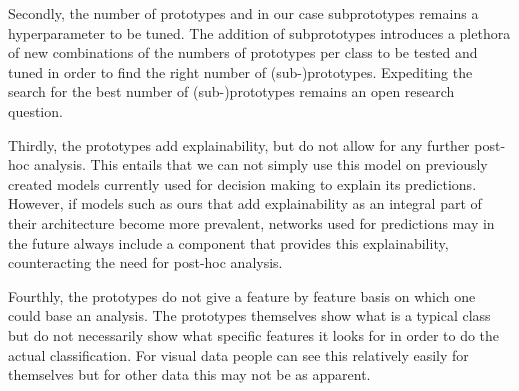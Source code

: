 Secondly, the number of prototypes and in our case subprototypes remains a hyperparameter to be tuned. The addition of subprototypes introduces a plethora of new combinations of the numbers of prototypes per class to be tested and tuned in order to find the right number of (sub-)prototypes. Expediting the search for the best number of (sub-)prototypes remains an open research question.

Thirdly, the prototypes add explainability, but do not allow for any further post-hoc analysis. This entails that we can not simply use this model on previously created models currently used for decision making to explain its predictions. However, if models such as ours that add explainability as an integral part of their architecture become more prevalent, networks used for predictions may in the future always include a component that provides this explainability, counteracting the need for post-hoc analysis.

Fourthly, the prototypes do not give a feature by feature basis on which one could base an analysis. The prototypes themselves show what is a typical class but do not necessarily show what specific features it looks for in order to do the actual classification. For visual data people can see this relatively easily for themselves but for other data this may not be as apparent. 